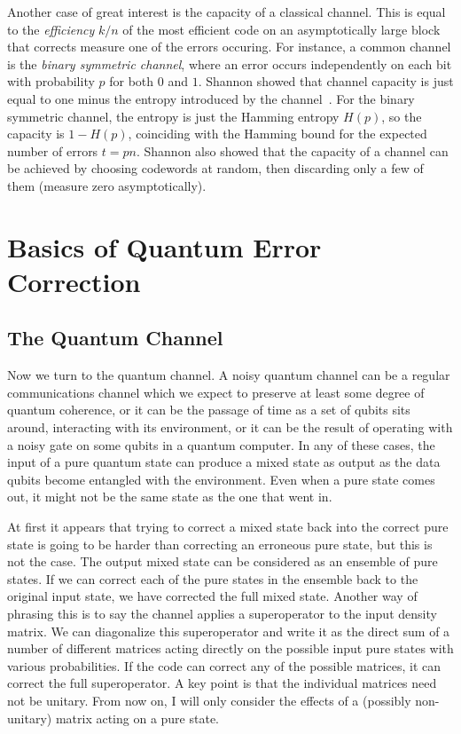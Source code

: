\documentclass{report}
\begin{document}
Another case of great interest is the capacity of a classical channel.  This 
is equal to the {\em efficiency} $k/n$ of the most efficient code on an 
asymptotically large block that corrects measure one of the errors occuring.  
For instance, a common channel is the {\em binary symmetric channel}, where an 
error occurs independently on each bit with probability $p$ for both $0$ and 
$1$.  Shannon showed that channel capacity is just equal to one minus the 
entropy introduced by the channel~\cite{shannon}.  For the binary symmetric 
channel, the entropy is just the Hamming entropy $H(p)$, so the capacity is 
$1-H(p)$, coinciding with the Hamming bound for the expected number of errors 
$t = pn$.  Shannon also showed that the capacity of a channel can be achieved 
by choosing codewords at random, then discarding only a few of them (measure 
zero asymptotically).

\chapter{Basics of Quantum Error Correction}
\label{chap-basics}

\section{The Quantum Channel}

Now we turn to the quantum channel.  A noisy quantum channel can be a 
regular communications channel which we expect to preserve at least some 
degree of quantum coherence, or it can be the passage of time as a set of 
qubits sits around, interacting with its environment, or it can be the result 
of operating with a noisy gate on some qubits in a quantum computer.  
In any of these cases, the input of a pure quantum state can produce a 
mixed state as output as the data qubits become entangled with the 
environment.  Even when a pure state comes out, it might not be the same 
state as the one that went in.

At first it appears that trying to correct a mixed state back into the correct
pure state is going to be harder than correcting an erroneous pure state, but 
this is not the case.  The output mixed state can be considered as an ensemble 
of pure states.  If we can correct each of the pure states in the ensemble 
back to the original input state, we have corrected the full mixed state.  
Another way of phrasing this is to say the channel applies a 
superoperator to the input density matrix.  We can diagonalize 
this superoperator and write it as the direct sum of a number of 
different matrices acting directly on the possible input pure states with 
various probabilities.  If the code can correct any of the possible matrices, 
it can correct the full superoperator.  A key point is that the 
individual matrices need not be unitary.  From now on, I will only consider 
the effects of a (possibly non-unitary) matrix acting on a pure state.
\end{document}
